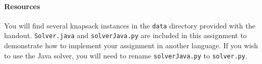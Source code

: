 \documentclass[11pt]{article}
\begin{document}


\paragraph{Resources}
You will find several knapsack instances in the \texttt{data} directory provided with the handout.  \texttt{Solver.java} and \texttt{solverJava.py} are included in this assignment to demonstrate how to implement your assignment in another language.  If you wish to use the Java solver, you will need to rename \texttt{solverJava.py} to \texttt{solver.py}.











%


\end{document}
